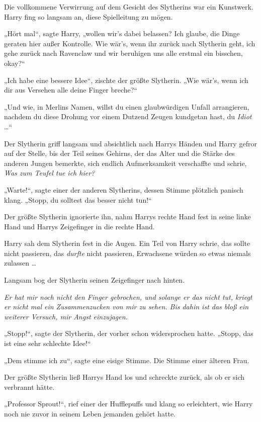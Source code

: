 {Die vollkommene Verwirrung auf dem Gesicht des Slytherins war ein Kunstwerk. Harry fing so langsam an, diese Spielleitung zu mögen.

„Hört mal“, sagte Harry, „wollen wir's dabei belassen? Ich glaube, die Dinge geraten hier außer Kontrolle. Wie wär's, wenn ihr zurück nach Slytherin geht, ich gehe zurück nach Ravenclaw und wir beruhigen uns alle erstmal ein bisschen, okay?“

„Ich habe eine bessere Idee“, zischte der größte Slytherin. „Wie wär's, wenn ich dir aus Versehen alle deine Finger breche?“

„Und wie, in Merlins Namen, willst du einen glaubwürdigen Unfall arrangieren, nachdem du diese Drohung vor einem Dutzend Zeugen kundgetan hast, du \emph{Idiot} …“

Der Slytherin griff langsam und absichtlich nach Harrys Händen und Harry gefror auf der Stelle, bis der Teil seines Gehirns, der das Alter und die Stärke des anderen Jungen bemerkte, sich endlich Aufmerksamkeit verschaffte und schrie, \emph{Was zum Teufel tue ich hier?}

„Warte!“, sagte einer der anderen Slytherins, dessen Stimme plötzlich panisch klang. „Stopp, du solltest das besser nicht tun!“

Der größte Slytherin ignorierte ihn, nahm Harrys rechte Hand fest in seine linke Hand und Harrys Zeigefinger in die rechte Hand.

Harry sah dem Slytherin fest in die Augen. Ein Teil von Harry schrie, das sollte nicht passieren, das \emph{durfte} nicht passieren, Erwachsene würden so etwas niemals zulassen …

Langsam bog der Slytherin seinen Zeigefinger nach hinten.

\emph{Er hat mir noch nicht den Finger gebrochen, und solange er das nicht tut, kriegt er nicht mal ein Zusammenzucken von mir zu sehen. Bis dahin ist das bloß ein weiterer Versuch, mir Angst einzujagen.}

„Stopp!“, sagte der Slytherin, der vorher schon widersprochen hatte. „Stopp, das ist eine sehr schlechte Idee!“

„Dem stimme ich zu“, sagte eine eisige Stimme. Die Stimme einer älteren Frau.

Der größte Slytherin ließ Harrys Hand los und schreckte zurück, als ob er sich verbrannt hätte.

„Professor Sprout!“, rief einer der Hufflepuffs und klang so erleichtert, wie Harry noch nie zuvor in seinem Leben jemanden gehört hatte.

}
